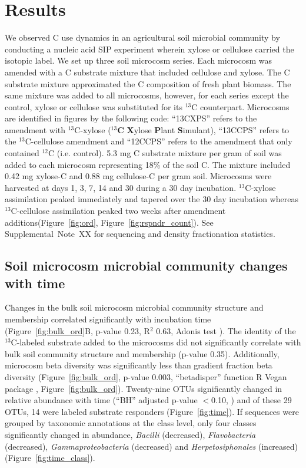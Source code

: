 \section{Results}
We observed C use dynamics in an agricultural soil microbial community by
conducting a nucleic acid SIP experiment wherein xylose or cellulose carried
the isotopic label. We set up three soil microcosm series. Each microcosm was
amended with a C substrate mixture that included cellulose and xylose. The
C substrate mixture approximated the C composition of fresh plant biomass. The
same mixture was added to all microcosms, however, for each
series except the control, xylose or cellulose was substituted for its $^{13}$C
counterpart. Microcosms are identified in figures by the following
code: ``13CXPS'' refers to the amendment with $^{13}$C-xylose ($^{13}$\textbf{C}
\textbf{X}ylose \textbf{P}lant \textbf{S}imulant), ``13CCPS'' refers to the
$^{13}$C-cellulose amendment and ``12CCPS'' refers to the amendment that only
contained $^{12}$C (i.e. control). 5.3 mg C substrate mixture per gram of soil
was added to each microcosm representing 18\% of the soil C. The mixture
included 0.42 mg xylose-C and 0.88 mg cellulose-C per gram soil. Microcosms
were harvested at days 1, 3, 7, 14 and 30 during a 30 day incubation.
$^{13}$C-xylose assimilation peaked immediately and tapered over the 30 day
incubation whereas $^{13}$C-cellulose assimilation peaked two weeks after
amendment additions(Figure~\ref{fig:ord}, Figure~\ref{fig:rspndr_count}). See
Supplemental~Note~XX for sequencing and density fractionation statistics.

\subsection{Soil microcosm microbial community changes with time}
Changes in the bulk soil microcosm microbial community structure and membership
correlated significantly with incubation time (Figure~\ref{fig:bulk_ord}B,
p-value 0.23, R$^{2}$ 0.63, Adonis test \citep{Anderson2001a}). The identity of
the $^{13}$C-labeled substrate added to the microcosms did not significantly
correlate with bulk soil community structure and membership (p-value 0.35).
Additionally, microcosm beta diversity was significantly less than gradient
fraction beta diversity (Figure~\ref{fig:bulk_ord}, p-value 0.003,
``betadisper'' function R Vegan package \citep{Anderson2006,oksanen2007vegan},
Figure~\ref{fig:bulk_ord}). Twenty-nine OTUs significantly changed in relative
abundance with time (``BH'' adjusted p-value $<$0.10, \citep{YBenjamini1995})
and of these 29 OTUs, 14 were labeled substrate responders
(Figure~\ref{fig:time}). If sequences were grouped by taxonomic annotations at
the class level, only four classes significantly changed in abundance,
\textit{Bacilli} (decreased), \textit{Flavobacteria} (decreased),
\textit{Gammaproteobacteria} (decreased) and \textit{Herpetosiphonales}
(increased) (Figure~\ref{fig:time_class}). 
   
